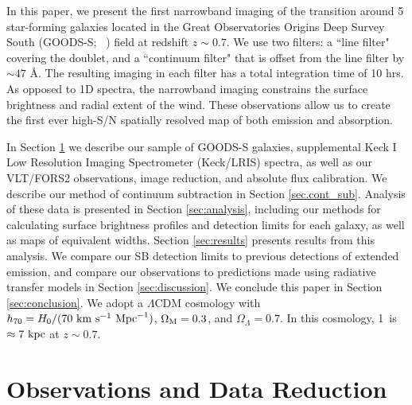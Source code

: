 \documentclass[twocolumn]{aastex62}
\newcommand{\citethnop}[1]{\citeauthor{#1}\ \citeyear{#1}}
\begin{document}
In this paper, we present the first narrowband imaging of the  transition around 5 star-forming  galaxies located in the Great Observatories Origins Deep Survey South (GOODS-S; \citethnop{Giavalisco2004})  field at redshift $z \sim 0.7$. 
We use two filters: a  ``line filter" covering the  doublet, and a ``continuum filter" that is offset from the line filter by ${\sim}47$ \AA.    
The resulting imaging in each filter has a total integration time of 10 hrs. As opposed to 1D spectra, the narrowband imaging constrains the surface brightness and radial extent of the wind. These observations allow us to create the first ever high-S/N spatially resolved map of both  emission and absorption. 

In Section \ref{sec:obs_red} we describe our sample of GOODS-S galaxies, supplemental Keck I Low Resolution Imaging Spectrometer (Keck/LRIS) spectra, as well as our VLT/FORS2 observations, image reduction, and absolute flux calibration. We describe our method of continuum subtraction in Section \ref{sec.cont_sub}. Analysis of these data is presented in Section \ref{sec:analysis}, 
including our methods for calculating surface brightness profiles and detection limits for each galaxy, as well as maps of  equivalent widths.
Section \ref{sec:results} presents results from this analysis. We compare our SB detection limits to previous detections of extended  emission,  and compare our observations to predictions made using radiative transfer models in Section \ref{sec:discussion}. We conclude this paper in Section \ref{sec:conclusion}.
We adopt a $\Lambda$CDM cosmology with $h_{70} = H_0/(70\ \rm{ km}\ \rm{ s}^{-1}\ \rm{ Mpc}^{-1})$, $\Omega_{\rm{M}}= 0.3$, and $\Omega_{\Lambda} = 0.7$. In this cosmology, 1\arcsec\  is $\approx 7\ \rm kpc$ at $z \sim 0.7$.


\section{Observations and Data Reduction}\label{sec:obs_red}
\end{document}
